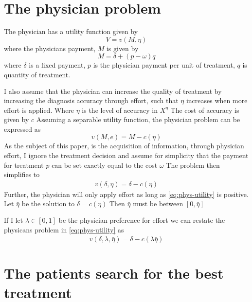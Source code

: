 \documentclass[10pt,a4paper]{article} 					%
\begin{document}

\section{The physician problem}

The physician has a utility function given by
\[
	V=v(M,\eta)
\]
where the physicians payment, \(M\) is given by
\[
	M=\delta+(p-\omega)q
\]
where \(\delta\) is a fixed payment, \(p\) is the physician payment per unit of treatment, \(q\) is quantity of treatment.

I also assume that the physician can increase the quality of treatment by increasing the diagnosis accuracy through effort, such that \(\eta\) increases when more effort is applied. Where \(\eta\) is the level of accuracy in \(X^\eta\) The cost of accuracy is given by \(c\)  Assuming a separable utility function, the physician problem can be expressed as
\[
	v(M,e)=M-c(\eta)
\]
As the subject of this paper, is the acquisition of information, through physician effort, I ignore the treatment decision and assume for simplicity that the payment for treatment \(p\) can be set exactly equal to the cost \(\omega\)  The problem then simplifies to
\begin{align}
v(\delta,\eta)=\delta-c(\eta)\label{eq:phys-utility}
\end{align}
Further, the physician will only apply effort as long as \cref{eq:phys-utility} is positive. Let \(\bar{\eta}\) be the solution to \(\delta=c(\eta)\)  Then \(\bar{\eta}\) must be between \([0,\bar{\eta}]\)

If I let \(\lambda\in[0,1]\) be the physician preference for effort we can restate the physicans problem in \cref{eq:phys-utility} as
\begin{align*}
 	 v(\delta,\lambda,\bar{\eta})=\delta-c(\lambda\bar{\eta})\label{eq:phys-utility2}
\end{align*}

\section{The patients search for the best treatment}
\end{document}
